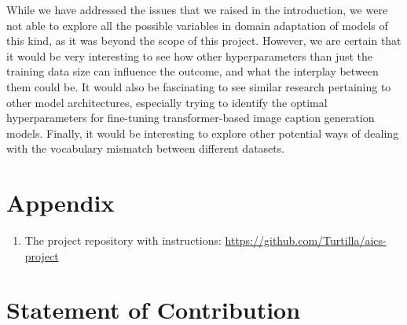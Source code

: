 \documentclass[11pt]{article}
\begin{document}
While we have addressed the issues that we raised in the introduction, we were not able to explore all the possible variables in domain adaptation of models of this kind, as it was beyond the scope of this project. However, we are certain that it would be very interesting to see how other hyperparameters than just the training data size can influence the outcome, and what the interplay between them could be. It would also be fascinating to see similar research pertaining to other model architectures, especially trying to identify the optimal hyperparameters for fine-tuning transformer-based image caption generation models. Finally, it would be interesting to explore other potential ways of dealing with the vocabulary mismatch between different datasets.



\appendix

\section{Appendix}
\label{sec:appendix}

\begin{enumerate}
    \item The project repository with instructions: \url{https://github.com/Turtilla/aics-project}
\end{enumerate}

\section{Statement of Contribution}
\label{sec:contribution}
\end{document}
